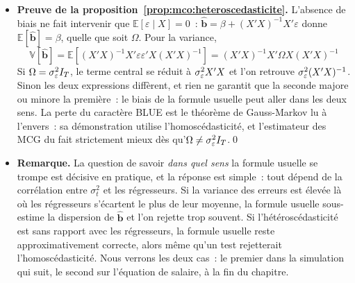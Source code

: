\documentclass[10pt]{beamer}
\begin{document}
\begin{notes}

  \begin{itemize}

  \item \textbf{Preuve de la proposition~\ref{prop:mco:heteroscedasticite}.}
    L'absence de biais ne fait intervenir que $\mathbb E[\varepsilon\mid X]=0$~:
    $\hat{\mathbf b}=\beta+(X'X)^{-1}X'\varepsilon$ donne
    $\mathbb E[\hat{\mathbf b}]=\beta$, quelle que soit $\Omega$. Pour la
    variance,
    \[
      \mathbb V\left[\hat{\mathbf b}\right] =
      \mathbb E\left[(X'X)^{-1}X'\varepsilon\varepsilon'X(X'X)^{-1}\right] =
      (X'X)^{-1}X'\Omega X(X'X)^{-1}
    \]
    Si $\Omega=\sigma_{\varepsilon}^2 I_T$, le terme central se réduit à $\sigma_{\varepsilon}^2 X'X$ et l'on
    retrouve $\sigma_{\varepsilon}^2(X'X)^{-1}$. Sinon les deux expressions diffèrent, et rien
    ne garantit que la seconde majore ou minore la première~: le biais de la
    formule usuelle peut aller dans les deux sens. La perte du caractère BLUE
    est le théorème de Gauss-Markov lu à l'envers~: sa démonstration utilise
    l'homoscédasticité, et l'estimateur des MCG du  fait
    strictement mieux dès qu'$\Omega\neq\sigma_{\varepsilon}^2 I_T$.\qed\newline

  \item \textbf{Remarque.} La question de savoir \emph{dans quel sens} la
    formule usuelle se trompe est décisive en pratique, et la réponse est
    simple~: tout dépend de la corrélation entre $\sigma_t^2$ et les régresseurs.
    Si la variance des erreurs est élevée là où les régresseurs s'écartent le
    plus de leur moyenne, la formule usuelle sous-estime la dispersion de
    $\hat{\mathbf b}$ et l'on rejette trop souvent. Si l'hétéroscédasticité est
    sans rapport avec les régresseurs, la formule usuelle reste approximativement
    correcte, alors même qu'un test rejetterait l'homoscédasticité. Nous
    verrons les deux cas~: le premier dans la simulation qui suit, le second sur
    l'équation de salaire, à la fin du chapitre.

  \end{itemize}

\end{notes}
\end{document}
